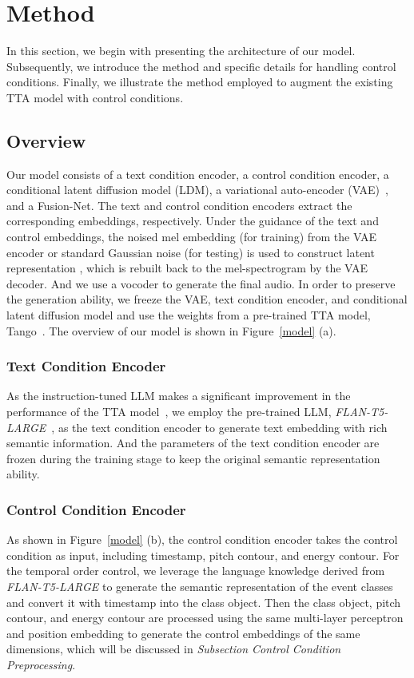 \documentclass[letterpaper]{article}
\begin{document}
\section{Method}

In this section, we begin with presenting the architecture of our model. Subsequently, we introduce the method and specific details for handling control conditions. Finally, we illustrate the method employed to augment the existing TTA model with control conditions.

\subsection{Overview}

Our model consists of a text condition encoder, a control condition encoder, a conditional latent diffusion model (LDM), a variational auto-encoder (VAE)~\cite{kingma2013vae}, and a Fusion-Net. The text and control condition encoders extract the corresponding embeddings, respectively. Under the guidance of the text and control embeddings, the noised mel embedding (for training) from the VAE encoder or standard Gaussian noise (for testing) is used to construct latent representation , which is rebuilt back to the mel-spectrogram by the VAE decoder. And we use a vocoder to generate the final audio. In order to preserve the generation ability, we freeze the VAE, text condition encoder, and conditional latent diffusion model and use the weights from a pre-trained TTA model, Tango~\cite{ghosal2023tango}. The overview of our model is shown in Figure~\ref{model} (a).

\subsubsection{Text Condition Encoder} As the instruction-tuned LLM makes a significant improvement in the performance of the TTA model~\cite{ghosal2023tango}, we employ the pre-trained LLM, \textit{FLAN-T5-LARGE}~\cite{chung2022siflm}, as the text condition encoder to generate text embedding with rich semantic information. And the parameters of the text condition encoder are frozen during the training stage to keep the original semantic representation ability.

\subsubsection{Control Condition Encoder} As shown in Figure~\ref{model} (b), the control condition encoder takes the control condition as input, including timestamp, pitch contour, and energy contour. For the temporal order control, we leverage the language knowledge derived from \textit{FLAN-T5-LARGE} to generate the semantic representation of the event classes and convert it with timestamp into the class object. Then the class object, pitch contour, and energy contour are processed using the same multi-layer perceptron and position embedding to generate the control embeddings of the same dimensions, which will be discussed in \textit{Subsection Control Condition Preprocessing}.
\end{document}
